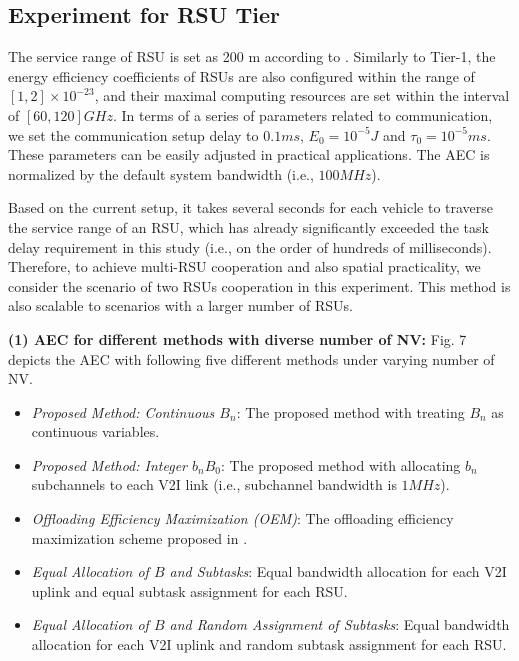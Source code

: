 \documentclass[lettersize,journal]{IEEEtran}
\begin{document}
\subsection{Experiment for RSU Tier}

The service range of RSU is set as 200 m according to \cite{ref31}. Similarly to Tier-1, the energy efficiency coefficients of RSUs are also configured within the range of $[1, 2]\times 10^{-23}$, and their maximal computing resources are set within the interval of $[60,120] GHz$. In terms of a series of parameters related to communication, we set the communication setup delay to $0.1 ms$, $E_0=10^{-5} J$ and $\tau_0=10^{-5} ms$. These parameters can be easily adjusted in practical applications. The AEC is normalized by the default system bandwidth (i.e., $100 MHz$).

Based on the current setup, it takes several seconds for each vehicle to traverse the service range of an RSU, which has already significantly exceeded the task delay requirement in this study (i.e., on the order of hundreds of milliseconds). Therefore, to achieve multi-RSU cooperation and also spatial practicality, we consider the scenario of two RSUs cooperation in this experiment. This method is also scalable to scenarios with a larger number of RSUs.


\textbf{(1) AEC for different methods with diverse number of NV:} Fig. 7 depicts the AEC with following five different methods under varying number of NV. 

\begin{itemize}

\item \textit{Proposed Method: Continuous $B_n$}: The proposed method with treating $B_n$ as continuous variables.

\item \textit{Proposed Method: Integer $b_n B_0$}: The proposed method with allocating $b_n$ subchannels to each V2I link (i.e., subchannel bandwidth is $1 MHz$).

\item \textit{Offloading Efficiency Maximization (OEM)}: The offloading efficiency maximization scheme proposed in \cite{ref22}.

\item \textit{Equal Allocation of $B$ and Subtasks}: Equal bandwidth allocation for each V2I uplink and equal subtask assignment for each RSU.

\item \textit{Equal Allocation of $B$ and Random Assignment of Subtasks}: Equal bandwidth allocation for each V2I uplink and random subtask assignment for each RSU.

\end{itemize}
\end{document}
